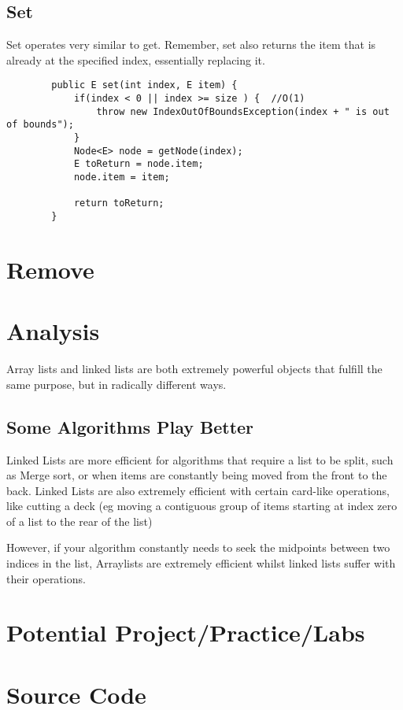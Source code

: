 	
	\subsection{Set}
	
	Set operates very similar to get.  Remember, set also returns the item that is already at the specified index, essentially replacing it.
	
	\begin{verbatim}
		public E set(int index, E item) {
			if(index < 0 || index >= size ) {  //O(1)
				throw new IndexOutOfBoundsException(index + " is out of bounds");
			}
			Node<E> node = getNode(index);
			E toReturn = node.item;
			node.item = item;
			
			return toReturn;
		}
	\end{verbatim}
	
	
	\section{Remove}
	
	
	
	
	\section{Analysis}
	Array lists and linked lists are both extremely powerful objects that fulfill  the same purpose, but in radically different ways. 
	
	
	
	
	\subsection{Some Algorithms Play Better}
	
	Linked Lists are more efficient for algorithms that require a list to be split, such as Merge sort, or when items are constantly being moved from the front to the back.
	Linked Lists are also extremely efficient with certain card-like operations, like cutting a deck (eg moving a contiguous group of items starting at index zero of a list to the rear of the list)
	
	
	However, if your algorithm  constantly needs to seek the midpoints between two indices in the list, Arraylists are extremely efficient whilst linked lists suffer with their operations.
	
	\section{Potential Project/Practice/Labs}
	
	\section{Source Code}
	\inputminted{python3}{code/linkedlist.py}
